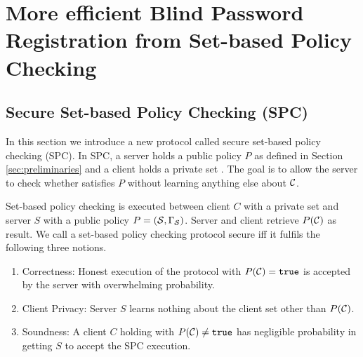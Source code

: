 \section{More efficient Blind Password Registration from Set-based Policy Checking}

\subsection{Secure Set-based Policy Checking (SPC)} \label{sec:spc}
In this section we introduce a new protocol called secure set-based policy checking (SPC). In SPC, a server holds a public policy $P$ as defined in Section \ref{sec:preliminaries} and a client holds a private set \cC. The goal is to allow the server to check whether \cC satisfies $P$ without learning anything else about $\mathcal{C}$. 

\begin{definition}\label{def:SPC}
Set-based policy checking is executed between client $C$ with a private set \cC and server $S$ with a public policy $P=(\mathcal{S},\Gamma_\mathcal{S})$.
Server and client retrieve $P(\mathcal{C})$ as result. 
We call a set-based policy checking protocol secure iff it fulfils the following three notions.
\begin{enumerate}
  \item Correctness: Honest execution of the protocol with $P(\mathcal{C})=\mathtt{true}$ is accepted by the server with overwhelming probability.
  \item Client Privacy: Server $S$ learns nothing about the client set \cC other than $P(\mathcal{C})$.
  \item Soundness: A client $C$ holding \cC with $P(\mathcal{C})\not=\mathtt{true}$ has negligible probability in getting $S$ to accept the SPC execution.
\end{enumerate}
\end{definition}

